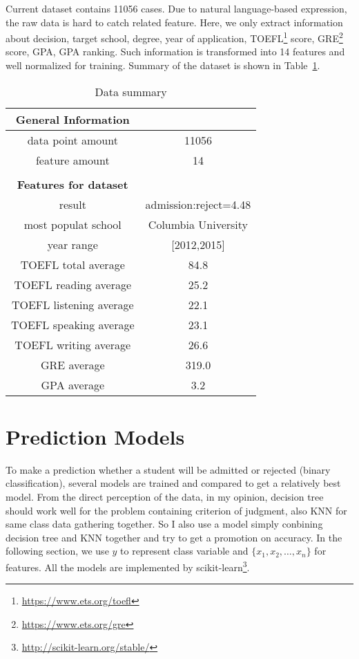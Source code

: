 \documentclass{article}
\begin{document}
Current dataset contains 11056 cases. Due to natural language-based expression, the raw data is hard to catch related feature. Here, we only extract information about decision, target school, degree, year of application, TOEFL\footnote{\url{https://www.ets.org/toefl}} score, GRE\footnote{\url{https://www.ets.org/gre}} score, GPA, GPA ranking. Such information is transformed into 14 features and well normalized for training. Summary of the dataset is shown in Table~\ref{tab: Data_summary}.

\begin{table}[htbp]

\centering
    \begin{tabular}{cc}
        \textbf{General Information}\\
        \hline
        data point amount & 11056\\
        feature amount & 14\\
        \hline\\
        \textbf{Features for dataset}\\
        \hline
        result & admission:reject=4.48\\
        most populat school & Columbia University\\
        year range & [2012,2015]\\
        TOEFL total average & 84.8\\
        TOEFL reading average & 25.2\\
        TOEFL listening average & 22.1\\
        TOEFL speaking average & 23.1\\
        TOEFL writing average & 26.6\\
        GRE average & 319.0\\
        GPA average & 3.2\\
        \hline
    \end{tabular}

\caption{Data summary}
\label{tab: Data_summary}
\end{table}

\section{Prediction Models}

To make a prediction whether a student will be admitted or rejected (binary classification), several models are trained and compared to get a relatively best model. From the direct perception of the data, in my opinion, decision tree should work well for the problem containing criterion of judgment, also KNN for same class data gathering together. So I also use a model simply conbining decision tree and KNN together and try to get a promotion on accuracy. In the following section, we use $y$ to represent class variable and $\{x_1,x_2,\dots, x_n\}$ for features. All the models are implemented by scikit-learn\footnote{\url{http://scikit-learn.org/stable/}}.
\end{document}
